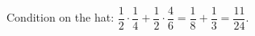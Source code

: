 Condition on the hat: $\dfrac{1}{2}\cdot\dfrac{1}{4}+\dfrac{1}{2}\cdot\dfrac{4}{6}=\dfrac{1}{8}+\dfrac{1}{3}=\boxed{\dfrac{11}{24}}$.
